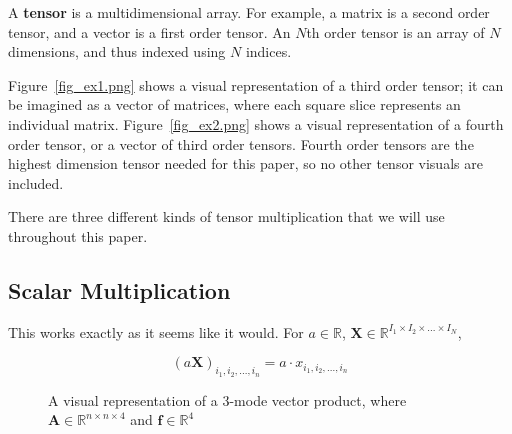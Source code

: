 \documentclass[twocolumn,10pt]{asme2ej}
\begin{document}
A \textbf{tensor} is a multidimensional array. For example, a matrix is a second order tensor, and a vector is a first order tensor. An $N$th order tensor is an array of $N$ dimensions, and thus indexed using $N$ indices.

Figure~\ref{fig_ex1.png} shows a visual representation of a third order tensor; it can be imagined as a vector of matrices, where each square slice represents an individual matrix. Figure~\ref{fig_ex2.png} shows a visual representation of a fourth
order tensor, or a vector of third order tensors. Fourth order tensors are the highest dimension tensor needed for this paper, so no other tensor visuals are included.

There are three different kinds of tensor multiplication that we will use throughout this paper.

\subsection{Scalar Multiplication}

This works exactly as it seems like it would. For $a \in \mathbb{R}$, $\bm{X} \in \mathbb{R}^{I_1 \times I_2 \times ... \times I_N}$,

\begin{equation}
(a\bm{X})_{i_1, i_2, ..., i_n} = a\cdot x_{i_1, i_2, ..., i_n}
\end{equation}

\begin{figure}
\caption{A visual representation of a 3-mode vector product, where $\bm{A} \in \mathbb{R}^{n \times n \times 4}$ and $\bm{f} \in \mathbb{R}^{4}$}
\label{fig_ex3.png}
\end{figure}
\end{document}
